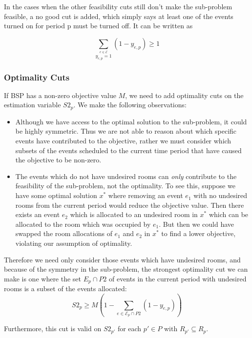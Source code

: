 \documentclass{article}
\newcommand{\E}{\mathcal{E}}
\begin{document}
\bigbreak

In the cases when the other feasibility cuts still don't make the sub-problem feasible, a no good cut is added, which simply says at least one of the events turned on for period p must be turned off. It can be written as

\begin{equation}
    \sum_{\stackrel{e \in \E}{y_{e,p} = 1}}(1-y_{e, p}) \ge 1
\end{equation}

\subsubsection*{Optimality Cuts} \label{optimality}
If BSP has a non-zero objective value $M$, we need to add optimality cuts on the estimation variable $S2_p$. We make
the following observations:
\begin{itemize}
    \item Although we have access to the optimal solution to the sub-problem, it could be highly symmetric. Thus we
        are not able to reason about which specific events have contributed to the objective, rather we must consider
        which subsets of the events scheduled to the current time period that have caused the objective to be non-zero.
    \item The events which do not have undesired rooms can \emph{only} contribute to the feasibility of the sub-problem,
        not the optimality. To see this, suppose we have some optimal solution $x^*$ where removing an event $e_1$ with
        no undesired rooms from the current period would reduce the objective value. Then there exists an event $e_2$
        which is allocated to an undesired room in $x^*$ which can be allocated to the room which was occupied by $e_1$.
        But then we could have swapped the room allocations of $e_1$ and $e_2$ in $x^*$ to find a lower objective,
        violating our assumption of optimality.
\end{itemize}
 Therefore we need only consider those events which have undesired rooms, and because of the symmetry in the sub-problem,
 the strongest optimality cut we can make is one where the set $E_p \cap P2$ of events in the current period with
 undesired rooms is a subset of the events allocated:
\begin{equation}
    S2_p \geq M \left(1 - \sum_{e \in \E_p \cap P2} (1 - y_{e, p})\right)
\end{equation}

Furthermore, this cut is valid on $S2_{p'}$ for each $p' \in P$ with $R_{p'} \subseteq R_p$.
\end{document}
